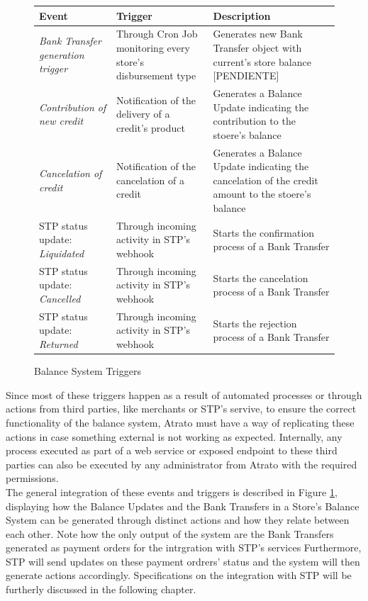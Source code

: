 \begin{figure}[H]
    \caption{Balance System Triggers}\label{fig:balance_system_triggers}
    \begin{tabularx}{1\textwidth} { 
    | >{\centering\arraybackslash}X 
    | >{\centering\arraybackslash}X 
    | >{\raggedright\arraybackslash}X | }
   \hline
   Event & Trigger & Description \\
   \hline
   \textit{Bank Transfer generation trigger} & Through Cron Job monitoring every store's disbursement type & Generates new Bank Transfer object with current's store balance [PENDIENTE]   \\
   \hline
   \textit{Contribution of new credit} & Notification of the delivery of a credit's product & Generates a Balance Update indicating the contribution to the stoere's balance  \\
   \hline
   \textit{Cancelation of credit} & Notification of the cancelation of a credit & Generates a Balance Update indicating the cancelation of the credit amount to the stoere's balance  \\
   \hline
   STP status update: \textit{Liquidated} & Through incoming activity in STP's webhook & Starts the confirmation process of a Bank Transfer   \\
   \hline
   STP status update: \textit{Cancelled} & Through incoming activity in STP's webhook & Starts the cancelation process of a Bank Transfer   \\
   \hline
   STP status update: \textit{Returned} & Through incoming activity in STP's webhook & Starts the rejection process of a Bank Transfer   \\
   \hline
\end{tabularx}
\end{figure}

    
Since most of these triggers happen as a result of automated processes or through actions from third parties, like merchants or STP's servive, to ensure the correct functionality of the balance system, Atrato must have a way of replicating these actions in case something external is not working as expected. Internally, any process executed as part of a web service or exposed endpoint to these third parties can also be executed by any administrator from Atrato with the required permissions.\\
    
The general integration of these events and triggers is described in Figure \ref{fig:balance_system_triggers}, displaying how the Balance Updates and the Bank Transfers in a Store's Balance System can be generated through distinct actions and how they relate between each other. Note how the only output of the system are the Bank Transfers generated as payment orders for the intrgration with STP's services Furthermore, STP will send updates on these payment ordrers' status and the system will then generate actions accordingly. Specifications on the integration with STP will be furtherly discussed in the following chapter.


